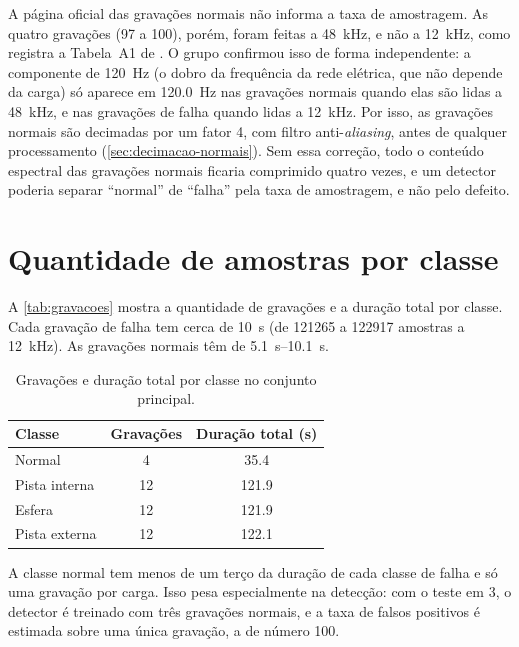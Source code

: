 A página oficial das gravações normais não informa a taxa de amostragem. As quatro gravações (97 a 100), porém, foram feitas a \SI{48}{\kilo\hertz}, e não a \SI{12}{\kilo\hertz}, como registra a Tabela~A1 de \textcite{smith2015}. O grupo confirmou isso de forma independente: a componente de \SI{120}{\hertz} (o dobro da frequência da rede elétrica, que não depende da carga) só aparece em \SI{120.0}{\hertz} nas gravações normais quando elas são lidas a \SI{48}{\kilo\hertz}, e nas gravações de falha quando lidas a \SI{12}{\kilo\hertz}. Por isso, as gravações normais são decimadas por um fator 4, com filtro anti-\emph{aliasing}, antes de qualquer processamento (\autoref{sec:decimacao-normais}). Sem essa correção, todo o conteúdo espectral das gravações normais ficaria comprimido quatro vezes, e um detector poderia separar ``normal'' de ``falha'' pela taxa de
amostragem, e não pelo defeito.

\section{Quantidade de amostras por classe}
\label{sec:amostras-por-classe}

A \autoref{tab:gravacoes} mostra a quantidade de gravações e a duração total por classe. Cada gravação de falha tem cerca de \SI{10}{\second} (de
\num{121265} a \num{122917} amostras a \SI{12}{\kilo\hertz}). As gravações normais têm de \SIrange{5.1}{10.1}{\second}.

\begin{table}[htb]
  \centering
  \caption{Gravações e duração total por classe no conjunto principal.}
  \label{tab:gravacoes}
  \begin{tabular}{lcc}
    \toprule
    \textbf{Classe} & \textbf{Gravações} & \textbf{Duração total (s)} \\
    \midrule
    Normal          & 4  & \num{35.4} \\
    Pista interna   & 12 & \num{121.9} \\
    Esfera          & 12 & \num{121.9} \\
    Pista externa   & 12 & \num{122.1} \\
    \bottomrule
  \end{tabular}
\end{table}

A classe normal tem menos de um terço da duração de cada classe de falha e só uma gravação por carga. Isso pesa especialmente na detecção: com o teste em \SI{3}{\hp}, o detector é treinado com três gravações normais, e a taxa de falsos positivos é estimada sobre uma única gravação, a de número 100.

